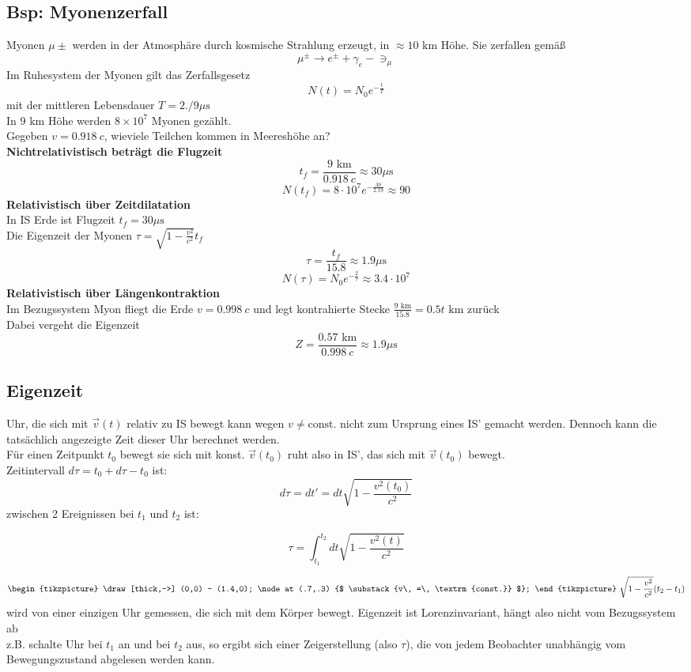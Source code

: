 \documentclass[titlepage,12pt,a4paper,ngerman]{report}
\newcommand{\tx}[1]{\textrm{#1}}
\newcommand{\const}{\tx{const.}}
\newcommand{\frbox}[2]{\begin{tcolorbox}[colback=white,colframe=red!75!black,fonttitle=\bfseries,title=#1]#2\end{tcolorbox}} %
\begin{document}
\subsection*{Bsp: Myonenzerfall}
Myonen $ \mu \pm $ werden in der Atmosphäre durch kosmische Strahlung erzeugt, in $ \approx 10 \tx{ km} $ Höhe. Sie zerfallen gemäß
$$ \mu ^\pm \rightarrow e^\pm + \gamma_{e} - \ni _{\mu}$$
Im Ruhesystem der Myonen gilt das Zerfallsgesetz
$$ N(t) = N_0 e^{-\frac{t}{T}} $$
mit der mittleren Lebensdauer $ T = 2./9 \mu \tx{s} $\\
In 9 km Höhe werden $ 8 \times 10^7 $ Myonen gezählt.\\
Gegeben $ v = 0.918 \ c $, wieviele Teilchen kommen in Meereshöhe an?\\
\textbf{Nichtrelativistisch beträgt die Flugzeit}\\
$$t_{f} = \frac{9 \tx{ km}}{0.918 \ c} \approx 30 \mu \tx{s}$$
$$N(t_{f}) = 8 \cdot 10^7 e^{-\frac{30}{2.19}} \approx 90$$
\textbf{Relativistisch über Zeitdilatation}\\
In IS Erde ist Flugzeit $ t_{f} = 30 \mu \tx{s} $\\
Die Eigenzeit der Myonen $ \tau = \sqrt{1-\frac{v^2}{c^2}} t_{f} $
$$\tau = \frac{t_{f}}{15.8} \approx 1.9 \mu \tx{s}$$
$$N(\tau) = N_0 e^{-\frac{2}{\tau}} \approx 3.4 \cdot 10^7$$
\textbf{Relativistisch über Längenkontraktion}\\
Im Bezugssystem Myon fliegt die Erde $ v = 0.998 \ c $ und legt kontrahierte Stecke $ \frac{9 \tx{ km}}{15.8} = 0.5t \tx{ km} $ zurück\\
Dabei vergeht die Eigenzeit
$$Z = \frac{0.57 \tx{ km}}{0.998 \ c} \approx 1.9 \mu \tx{s}$$


\subsection{Eigenzeit}
Uhr, die sich mit $ \vec{v}(t) $  relativ zu IS bewegt kann wegen $ v \neq \const $ nicht zum Ursprung eines IS' gemacht werden. Dennoch kann die tatsächlich angezeigte Zeit dieser Uhr berechnet werden.\\
Für einen Zeitpunkt $ t_0 $ bewegt sie sich mit konst. $ \vec{v}(t_0) $ ruht also in IS', das sich mit $ \vec{v}(t_0) $ bewegt.\\
Zeitintervall $ d \tau = t_0 + d\tau - t_0 $ ist:
$$ d\tau = dt' = dt \sqrt{1-\frac{v^2(t_0)}{c^2}}$$
zwischen 2 Ereignissen bei $ t_1 $ und $ t_2 $ ist:
\frbox{Eigenzeit}{$$ \tau = \int_{t_1}^{t_2} dt \sqrt{1 - \frac{v^2(t)}{c^2}}$$}
$$\begin{tikzpicture}
\draw[thick,->] (0,0) -- (1.4,0);
\node at (.7,.3) {$ \substack{v\, =\, \const} $};
\end{tikzpicture} \ \sqrt{1 - \frac{v^2}{c^2}} (t_2 - t_1)$$
wird von einer einzigen Uhr gemessen, die sich mit dem Körper bewegt. Eigenzeit ist Lorenzinvariant, hängt also nicht vom Bezugssystem ab\\
z.B. schalte Uhr bei $ t_1 $ an und bei $ t_2 $ aus, so ergibt sich einer Zeigerstellung (also $ \tau $), die von jedem Beobachter unabhängig vom Bewegungszustand abgelesen werden kann.
\end{document}

